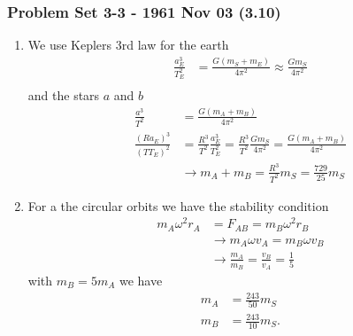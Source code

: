 \documentclass[10pt,a4paper]{article}
\theoremstyle{definition}
\begin{document}
\subsubsection{Problem Set 3-3 - 1961 Nov 03 (3.10)}
\begin{enumerate}[label=(\alph*)]
\item We use Keplers 3rd law for the earth
\begin{align}
    \frac{a_E^3}{T_E^2}&=\frac{G(m_S+m_E)}{4\pi^2}\approx\frac{Gm_S}{4\pi^2}\\
\end{align}
and the stars $a$ and $b$
\begin{align}
    \frac{a^3}{T^2}&=\frac{G(m_A+m_B)}{4\pi^2}\\
    \frac{(Ra_E)^3}{(TT_E)^2}&=\frac{R^3}{T^2}\frac{a_E^3}{T_E^2}=\frac{R^3}{T^2}\frac{Gm_S}{4\pi^2}=\frac{G(m_A+m_B)}{4\pi^2}\\
    &\rightarrow m_A+m_B = \frac{R^3}{T^2}m_S=\frac{729}{25}m_S
\end{align}

\item For a the circular orbits we have the stability condition
\begin{align}
    m_A\omega^2r_A&=F_{AB}=m_B\omega^2r_B\\
    &\rightarrow m_A\omega v_A=m_B\omega v_B\\
    &\rightarrow \frac{m_A}{m_B} =\frac{v_B}{v_A}=\frac{1}{5}
\end{align}
with $m_B=5m_A$ we have 
\begin{align}
    m_A&=\frac{243}{50}m_S\\
    m_B&=\frac{243}{10}m_S.
\end{align}
\end{enumerate}
\end{document}
